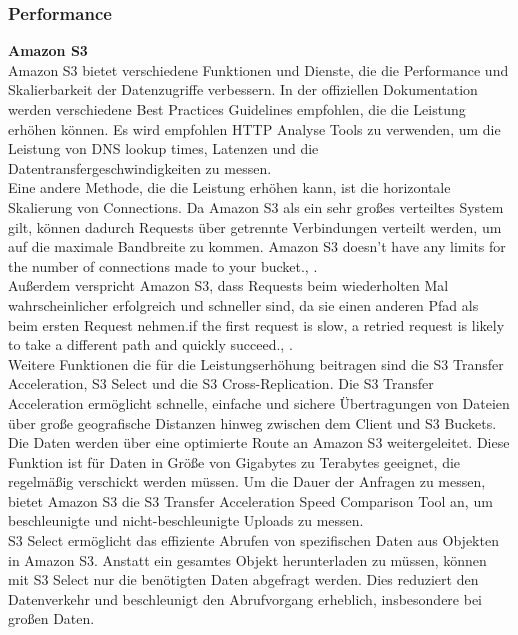 \newpage

\subsubsection{Performance}

\textbf{Amazon S3}\\

Amazon S3 bietet verschiedene Funktionen und Dienste, die die Performance und Skalierbarkeit der Datenzugriffe verbessern. In der offiziellen Dokumentation \cite{performance-guide} werden verschiedene Best Practices Guidelines empfohlen, die die Leistung erhöhen können. Es wird empfohlen HTTP Analyse Tools zu verwenden, um die Leistung von DNS lookup times, Latenzen und die Datentransfergeschwindigkeiten zu messen.\\

Eine andere Methode, die die Leistung erhöhen kann, ist die horizontale Skalierung von Connections. Da Amazon S3 als ein sehr großes verteiltes System gilt, können dadurch Requests über getrennte Verbindungen verteilt werden, um auf die maximale Bandbreite zu kommen. \glqq Amazon S3 doesn't have any limits for the number of connections made to your bucket.\grqq, \cite{performance-guide}.\\Außerdem verspricht Amazon S3, dass Requests beim wiederholten Mal wahrscheinlicher erfolgreich und schneller sind, da sie einen anderen Pfad als beim ersten Request nehmen.\glqq[...] if the first request is slow, a retried request is likely to take a different path and quickly succeed.\grqq, \cite{performance-guide}.\\

Weitere Funktionen die für die Leistungserhöhung beitragen sind die S3 Transfer Acceleration, S3 Select und die S3 Cross-Replication. Die S3 Transfer Acceleration ermöglicht schnelle, einfache und sichere Übertragungen von Dateien über große geografische Distanzen hinweg zwischen dem Client und S3 Buckets. Die Daten werden über eine optimierte Route an Amazon S3 weitergeleitet. Diese Funktion ist für Daten in Größe von Gigabytes zu Terabytes geeignet, die regelmäßig verschickt werden müssen. Um die Dauer der Anfragen zu messen, bietet Amazon S3 die S3 Transfer Acceleration Speed Comparison Tool an, um beschleunigte und nicht-beschleunigte Uploads zu messen.\\

S3 Select ermöglicht das effiziente Abrufen von spezifischen Daten aus Objekten in Amazon S3. Anstatt ein gesamtes Objekt herunterladen zu müssen, können mit S3 Select nur die benötigten Daten abgefragt werden. Dies reduziert den Datenverkehr und beschleunigt den Abrufvorgang erheblich,  insbesondere bei großen Daten.\\


